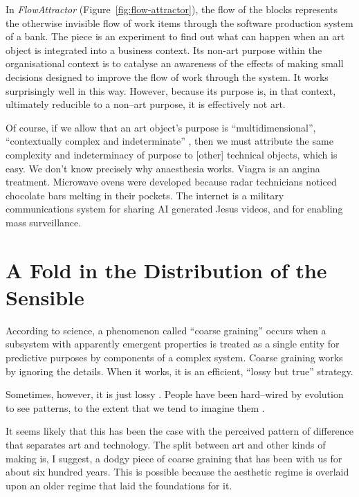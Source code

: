 \documentclass[letter:wpaper]{article}
\begin{document}
    In \emph{FlowAttractor} (Figure~\ref{fig:flow-attractor}), the flow of the blocks represents the otherwise invisible flow of work items through the software production system of a bank. The piece is an experiment to find out what can happen when an art object is integrated into a business context. Its non-art purpose within the organisational context is to catalyse an awareness of the effects of making small decisions designed to improve the flow of work through the system. It works surprisingly well in this way. However, because its purpose is, in that context, ultimately reducible to a non–art purpose, it is effectively not art.
    
    Of course, if we allow that an art object's purpose is ``multidimensional'', ``contextually complex and indeterminate'' \citep[p.25]{HoelscherThPtcsOfPhsSpc2014}, then we must attribute the same complexity and indeterminacy of purpose to [other] technical objects, which is easy. We don't know precisely why anaesthesia works. Viagra is an angina treatment. Microwave ovens were developed because radar technicians noticed chocolate bars melting in their pockets. The internet is a military communications system for sharing AI generated Jesus videos, and for enabling mass surveillance. 

\section{A Fold in the Distribution of the Sensible}
    
    According to science, a phenomenon called ``coarse graining'' occurs when a subsystem with apparently emergent properties is treated as a single entity for predictive purposes by components of a complex system. Coarse graining works by ignoring the details. When it works, it is an efficient, ``lossy but true'' \citep[p.4]{FlackCrsGrnng2017} strategy.

    Sometimes, however, it is just lossy \citep[p.8]{FlackCrsGrnng2017}. People have been hard–wired by evolution to see patterns, to the extent that we tend to imagine them \citep{FristonThFrEnrgPrncpl2010}.
    
    It seems likely that this has been the case with the perceived pattern of difference that separates art and technology. The split between art and other kinds of making is, I suggest, a dodgy piece of coarse graining that has been with us for about six hundred years. This is possible because the aesthetic regime is overlaid upon an older regime that laid the foundations for it. 
    
\end{document}
